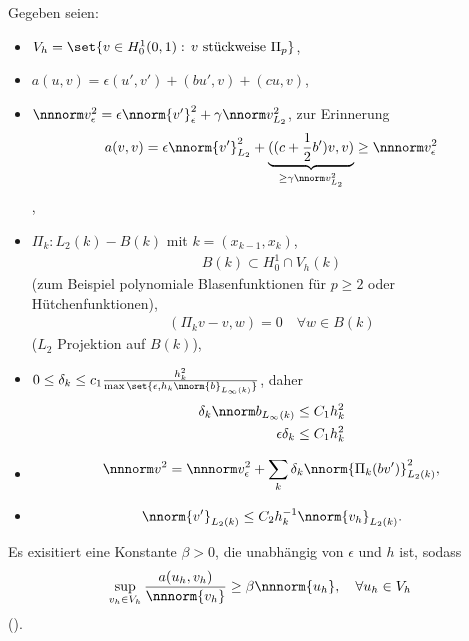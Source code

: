Gegeben seien:
\begin{itemize}
\item $V_{h} = \set{v \in H_{0}^{1}(0, 1): \, v \text{ stückweise } \Pi_{p}}$, 
\item $a(u, v) = \epsilon(u', v') + (bu', v) + (cu, v)$, 
\item $\nnnorm v_{\epsilon}^{2} = \epsilon \nnorm {v'}_{\epsilon}^{2} + \gamma \nnorm v _{L_{2}}^{2}$, zur Erinnerung
  \begin{align}\label{eq:1}
    a(v, v) = \epsilon \nnorm{v'}_{L_{2}}^{2} + \underbrace{(( c + \frac 12 b')v, v)}_{\geq \gamma \nnorm v_{L_{2}}^{2}} \geq \nnnorm v _{\epsilon}^{2}
  \end{align}, 
\item $\Pi_{k}: L_{2}(k) - B(k)$ mit $k = (x_{k-1}, x_{k})$,
  \begin{align*}
    B(k) \subset H_{0}^{1} \cap V_{h}(k)
  \end{align*}
  (zum Beispiel polynomiale Blasenfunktionen für $p \geq 2$ oder Hütchenfunktionen),
  \begin{align}\label{eq:2}
    (\Pi_{k} v - v, w) = 0 \quad \forall w \in B(k)
  \end{align}
  ($L_{2}$ Projektion auf $B(k)$), 
\item $0 \leq \delta_{k} \leq c_{1} \frac{h_{k}^{2}} {\max \set{\epsilon, h_{k}\nnorm{b}_{L_{\infty}(k)}}}$, daher
  \begin{align}
    \delta_{k} \nnorm b_{L_{\infty}(k)} &\leq C_{1} h_{k}^{2} \label{eq:3}\\
    \epsilon\delta_{k} &\leq C_{1} h_{k}^{2} \label{eq:4}\\
  \end{align}
\item
  \begin{align}\label{eq:5}
    \nnnorm v ^{2} = \nnnorm v_{\epsilon}^{2} + \sum_{k} \delta_{k} \nnorm{\Pi_{k} (bv')}^{2}_{L_{2}(k)}, 
  \end{align}
\item 
  \begin{align}\label{eq:6}
    \nnorm {v'}_{L_{2}(k)}  \leq C_{2} h_{k}^{-1} \nnorm {v_{h}}_{L_{2}(k)}. 
  \end{align}
\end{itemize}
\begin{satz}\label{thm:6-23}
  Es exisitiert eine Konstante $\beta > 0$, die unabhängig von $\epsilon$ und $h$ ist, sodass
  \begin{align*}
    \sup_{v_{h} \in V_{h}} \frac{a(u_{h}, v_{h})}{\nnnorm {v_{h}}} \geq \beta \nnnorm {u_{h}}, \quad \forall u_{h} \in V_{h}
  \end{align*}
  (). 
\end{satz}
